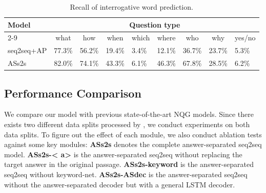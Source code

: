 \documentclass[letterpaper]{article} %
\newcommand\Tstrut{\rule{0pt}{2.3ex}}         %
\begin{document}
\begin{table}[!htb]
\centering
\begin{tabular}{|l|l|l|l|l|l|l|l|l|}
\hline
\multirow{2}{*}{Model} & \multicolumn{8}{c|}{Question type}\Tstrut  \\ \cline{2-9}
 & \multicolumn{1}{c|}{what} & \multicolumn{1}{c|}{how} & \multicolumn{1}{c|}{when} & \multicolumn{1}{c|}{which} & \multicolumn{1}{c|}{where} & \multicolumn{1}{c|}{who} & \multicolumn{1}{c|}{why} & \multicolumn{1}{c|}{yes/no}\Tstrut  \\ \hline
seq2seq+AP & 77.3\% & 56.2\% & 19.4\% & 3.4\% & 12.1\% & 36.7\% & 23.7\% & 5.3\%\Tstrut  \\ \hline
ASs2s & 82.0\% & 74.1\% & 43.3\% & 6.1\% & 46.3\% & 67.8\% & 28.5\% & 6.2\%\Tstrut  \\ \hline
\end{tabular}
\caption{Recall of interrogative word prediction.}
\label{table:interrogative word}
\end{table}


\subsection{Performance Comparison}
We compare our model with previous state-of-the-art NQG models. Since there exists two different data splits processed by \cite{du2017learning,zhou2017neural}, we conduct experiments on both data splits. To figure out the effect of each module, we also conduct ablation tests against some key modules: \textbf{ASs2s} denotes the complete answer-separated seq2seq model. \textbf{ASs2s-\textless{} a\textgreater{}} is the answer-separated seq2seq without replacing the target answer in the original passage. \textbf{ASs2s-keyword} is the answer-separated seq2seq without keyword-net. \textbf{ASs2s-ASdec} is the answer-separated seq2seq without the answer-separated decoder but with a general LSTM decoder.
\end{document}
